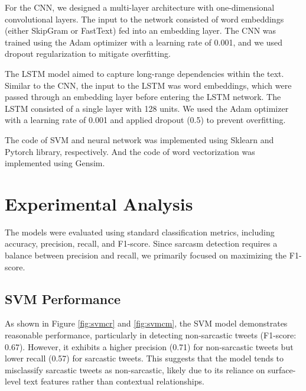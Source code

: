 \documentclass[11pt]{article}
\begin{document}
For the CNN, we designed a multi-layer architecture with one-dimensional convolutional layers. The input to the network consisted of word embeddings (either SkipGram or FastText) fed into an embedding layer. The CNN was trained using the Adam optimizer with a learning rate of 0.001, and we used dropout regularization to mitigate overfitting.

The LSTM model aimed to capture long-range dependencies within the text. Similar to the CNN, the input to the LSTM was word embeddings, which were passed through an embedding layer before entering the LSTM network. The LSTM consisted of a single layer with 128 units. We used the Adam optimizer with a learning rate of 0.001 and applied dropout (0.5) to prevent overfitting.

The code of SVM and neural network was implemented using Sklearn and Pytorch library, respectively. And the code of word vectorization was implemented using Gensim.

\section{Experimental Analysis}
The models were evaluated using standard classification metrics, including accuracy, precision, recall, and F1-score. Since sarcasm detection requires a balance between precision and recall, we primarily focused on maximizing the F1-score.

\subsection{SVM Performance}
As shown in Figure \ref{fig:svmcr} and \ref{fig:svmcm}, the SVM model demonstrates reasonable performance, particularly in detecting non-sarcastic tweets (F1-score: 0.67). However, it exhibits a higher precision (0.71) for non-sarcastic tweets but lower recall (0.57) for sarcastic tweets. This suggests that the model tends to misclassify sarcastic tweets as non-sarcastic, likely due to its reliance on surface-level text features rather than contextual relationships.
\end{document}
